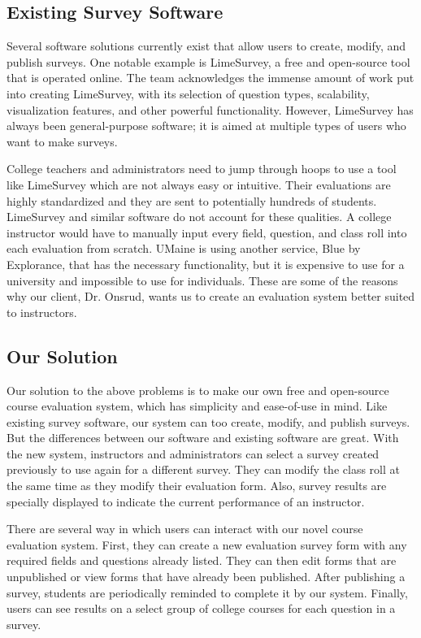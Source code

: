 \documentclass{article}
\begin{document}
\subsection{Existing Survey Software}

Several software solutions currently exist that allow users to create, modify, and publish surveys. One notable example is LimeSurvey, a free and open-source tool that is operated online. The team acknowledges the immense amount of work put into creating LimeSurvey, with its selection of question types, scalability, visualization features, and other powerful functionality. However, LimeSurvey has always been general-purpose software; it is aimed at multiple types of users who want to make surveys.

College teachers and administrators need to jump through hoops to use a tool like LimeSurvey which are not always easy or intuitive. Their evaluations are highly standardized and they are sent to potentially hundreds of students. LimeSurvey and similar software do not account for these qualities. A college instructor would have to manually input every field, question, and class roll into each evaluation from scratch.  UMaine is using another service, Blue by Explorance, that has the necessary functionality, but it is expensive to use for a university and impossible to use for individuals. These are some of the reasons why our client, Dr. Onsrud, wants us to create an evaluation system better suited to instructors.

\subsection{Our Solution}

Our solution to the above problems is to make our own free and open-source course evaluation system, which has simplicity and ease-of-use in mind. Like existing survey software, our system can too create, modify, and publish surveys. But the differences between our software and existing software are great. With the new system, instructors and administrators can select a survey created previously to use again for a different survey. They can modify the class roll at the same time as they modify their evaluation form. Also, survey results are specially displayed to indicate the current performance of an instructor.

There are several way in which users can interact with our novel course evaluation system. First, they can create a new evaluation survey form with any required fields and questions already listed. They can then edit forms that are unpublished or view forms that have already been published. After publishing a survey, students are periodically reminded to complete it by our system. Finally, users can see results on a select group of college courses for each question in a survey.
\end{document}

